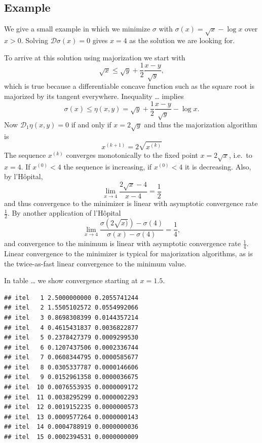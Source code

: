 \documentclass[
  12pt,
]{article}
\begin{document}
\subsection{Example}\label{example}

We give a small example in which we minimize \(\sigma\) with \(\sigma(x)=\sqrt{x}-\log{x}\)
over \(x>0\). Solving \(\mathcal{D}\sigma(x)=0\) gives \(x=4\) as the solution we
are looking for.

To arrive at this solution using majorization we start with
\[
\sqrt{x}\leq\sqrt{y}+\frac12\frac{x-y}{\sqrt{y}},
\]
which is true because a differentiable concave function such as the square root is majorized by its tangent everywhere.
Inequality \ldots{} implies
\[
\sigma(x)\leq\eta(x,y)=\sqrt{y}+\frac12\frac{x-y}{\sqrt{y}}-\log{x}.
\]
Now \(\mathcal{D}_1\eta(x,y)=0\) if and only if \(x=2\sqrt{y}\) and thus the majorization algorithm is
\[
x^{(k+1)}=2\sqrt{x^{(k)}}
\]
The sequence \(x^{(k)}\) converges monotonically to the fixed point \(x=2\sqrt{x}\), i.e.~to \(x=4\). If \(x^{(0)}<4\) the sequence is increasing, if \(x^{(0)}<4\) it is decreasing. Also, by l'Hôpital,
\[
\lim_{x\rightarrow 4}\frac{2\sqrt{x}-4}{x-4}=\frac12
\]
and thus convergence to the minimizer is linear with asymptotic convergence rate \(\frac12\). By another application of l'Hôpital
\[
\lim_{x\rightarrow 4}\frac{\sigma(2\sqrt{x)})-\sigma(4)}{\sigma(x)-\sigma(4)}=\frac14,
\]
and convergence to the minimum is linear with asymptotic convergence rate \(\frac14\).
Linear convergence to the minimizer is typical for majorization algorithms, as is
the twice-as-fast linear convergence to the minimum value.

In table \ldots{} we show convergence starting at \(x=1.5\).

\begin{verbatim}
## itel   1 2.5000000000 0.2055741244 
## itel   2 1.5505102572 0.0554992066 
## itel   3 0.8698308399 0.0144357214 
## itel   4 0.4615431837 0.0036822877 
## itel   5 0.2378427379 0.0009299530 
## itel   6 0.1207437506 0.0002336744 
## itel   7 0.0608344795 0.0000585677 
## itel   8 0.0305337787 0.0000146606 
## itel   9 0.0152961358 0.0000036675 
## itel  10 0.0076553935 0.0000009172 
## itel  11 0.0038295299 0.0000002293 
## itel  12 0.0019152235 0.0000000573 
## itel  13 0.0009577264 0.0000000143 
## itel  14 0.0004788919 0.0000000036 
## itel  15 0.0002394531 0.0000000009
\end{verbatim}
\end{document}

